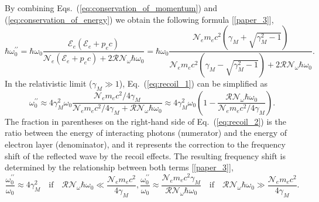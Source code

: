\documentclass[10pt, a4paper, twoside, openright]{report}
\begin{document}
By combining Eqs.~(\ref{eq:conservation_of_momentum}) and (\ref{eq:conservation_of_energy}) we obtain the following formula [\ref{paper_3}],
\begin{equation}\label{eq:recoil_1}
\hbar \omega_0^{\prime \prime} = \hbar \omega_0 \frac{\mathcal{E}_e \left( \mathcal{E}_e + p_e c \right)}{\mathcal{N}_e \left( \mathcal{E}_e + p_e c \right) + 2 \mathcal{R} \mathcal{N}_{\omega} \hbar \omega_0} = \hbar \omega_0 \frac{\mathcal{N}_e m_e c^2 \left( \gamma_M + \sqrt{\gamma_M^2 - 1} \right)}{\mathcal{N}_e m_e c^2 \left( \gamma_M - \sqrt{\gamma_M^2 - 1} \right) + 2 \mathcal{R} \mathcal{N}_{\omega} \hbar \omega_0}.
\end{equation}
In the relativistic limit ($ \gamma_M \gg 1 $), Eq.~(\ref{eq:recoil_1}) can be simplified as
\begin{equation}\label{eq:recoil_2}
\omega_0^{\prime \prime} \approx 4 \gamma_M^2 \omega_0 \frac{\mathcal{N}_e m_e c^2 / 4 \gamma_M}{\mathcal{N}_e m_e c^2 / 4 \gamma_M + \mathcal{R} \mathcal{N}_{\omega} \hbar \omega_0} \approx 4 \gamma_M^2 \omega_0 \left( 1 - \frac{\mathcal{R} \mathcal{N}_{\omega} \hbar \omega_0}{\mathcal{N}_e m_e c^2 / 4 \gamma_M} \right).
\end{equation}
The fraction in parentheses on the right-hand side of Eq.~(\ref{eq:recoil_2}) is the ratio between the energy of interacting photons (numerator) and the energy of electron layer (denominator), and it represents the correction to the frequency shift of the reflected wave by the recoil effects. The resulting frequency shift is determined by the relationship between both terms [\ref{paper_3}],
\begin{subequations}
\begin{equation}\label{eq:recoil_limit_1}
\frac{\omega_0^{\prime \prime}}{\omega_0} \approx 4 \gamma_M^2 \quad \mathrm{if} \quad \mathcal{R} \mathcal{N}_{\omega} \hbar \omega_0 \ll \frac{\mathcal{N}_e m_e c^2}{4 \gamma_M},
\end{equation}
\begin{equation}\label{eq:recoil_limit_2}
\frac{\omega_0^{\prime \prime}}{\omega_0} \approx \frac{\mathcal{N}_e m_e c^2 \gamma_M}{\mathcal{R} \mathcal{N}_{\omega} \hbar  \omega_0} \quad \mathrm{if} \quad \mathcal{R} \mathcal{N}_{\omega} \hbar \omega_0 \gg \frac{\mathcal{N}_e m_e c^2}{4 \gamma_M}. 
\end{equation}
\end{subequations}
\end{document}
